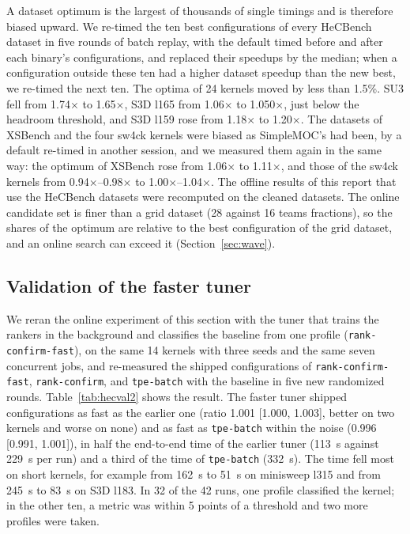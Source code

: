 \documentclass[10pt]{article}
\newcommand{\x}{\ensuremath{\times}}
\newcommand{\code}[1]{\texttt{#1}}
\begin{document}
A dataset optimum is the largest of thousands of single timings and is
therefore biased upward. We re-timed the ten best configurations of every
HeCBench dataset in five rounds of batch replay, with the default timed before
and after each binary's configurations, and replaced their speedups by the
median; when a configuration outside these ten had a higher dataset speedup
than the new best, we re-timed the next ten. The optima of 24 kernels moved by
less than 1.5\%. SU3 fell from 1.74\x{} to 1.65\x{}, S3D l165 from 1.06\x{}
to 1.050\x{}, just below the headroom threshold, and S3D l159 rose from
1.18\x{} to 1.20\x{}. The datasets of XSBench and the four sw4ck kernels were
biased as SimpleMOC's had been, by a default re-timed in another session, and
we measured them again in the same way: the optimum of XSBench rose from
1.06\x{} to 1.11\x{}, and those of the sw4ck kernels from 0.94\x{}--0.98\x{}
to 1.00\x{}--1.04\x{}. The offline results of this report that use the
HeCBench datasets were recomputed on the cleaned datasets. The online candidate
set is finer than a grid dataset (28 against 16 teams fractions), so the
shares of the optimum are relative to the best configuration of the grid
dataset, and an online search can exceed it (Section~\ref{sec:wave}).

\subsection{Validation of the faster tuner}
\label{sec:hecval2}
We reran the online experiment of this section with the tuner that trains the
rankers in the background and classifies the baseline from one profile
(\code{rank-confirm-fast}), on the same 14 kernels with three seeds and the
same seven concurrent jobs, and re-measured the shipped configurations of
\code{rank-confirm-fast}, \code{rank-confirm}, and \code{tpe-batch} with the
baseline in five new randomized rounds. Table~\ref{tab:hecval2} shows the
result. The faster tuner shipped configurations as fast as the earlier one
(ratio 1.001 [1.000, 1.003], better on two kernels and worse on none) and as
fast as \code{tpe-batch} within the noise (0.996 [0.991, 1.001]), in half the
end-to-end time of the earlier tuner (113~s against 229~s per run) and a third
of the time of \code{tpe-batch} (332~s). The time fell most on short kernels,
for example from 162~s to 51~s on minisweep l315 and from 245~s to 83~s on S3D
l183. In 32 of the 42 runs, one profile classified the kernel; in the other
ten, a metric was within 5 points of a threshold and two more profiles were
taken.
\end{document}
